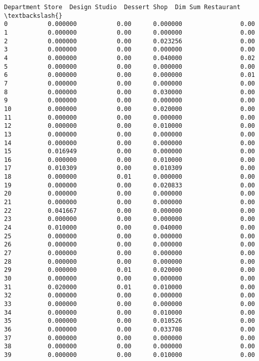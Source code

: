 \documentclass[11pt]{article}
\begin{document}
\begin{tcolorbox}[breakable, size=fbox, boxrule=.5pt, pad at break*=1mm, opacityfill=0]
\begin{Verbatim}[commandchars=\\\{\}]
    Department Store  Design Studio  Dessert Shop  Dim Sum Restaurant  \textbackslash{}
0           0.000000           0.00      0.000000                0.00
1           0.000000           0.00      0.000000                0.00
2           0.000000           0.00      0.023256                0.00
3           0.000000           0.00      0.000000                0.00
4           0.000000           0.00      0.040000                0.02
5           0.000000           0.00      0.000000                0.00
6           0.000000           0.00      0.000000                0.01
7           0.000000           0.00      0.000000                0.00
8           0.000000           0.00      0.030000                0.00
9           0.000000           0.00      0.000000                0.00
10          0.000000           0.00      0.020000                0.00
11          0.000000           0.00      0.000000                0.00
12          0.000000           0.00      0.010000                0.00
13          0.000000           0.00      0.000000                0.00
14          0.000000           0.00      0.000000                0.00
15          0.016949           0.00      0.000000                0.00
16          0.000000           0.00      0.010000                0.00
17          0.010309           0.00      0.010309                0.00
18          0.000000           0.01      0.000000                0.00
19          0.000000           0.00      0.020833                0.00
20          0.000000           0.00      0.000000                0.00
21          0.000000           0.00      0.000000                0.00
22          0.041667           0.00      0.000000                0.00
23          0.000000           0.00      0.000000                0.00
24          0.010000           0.00      0.040000                0.00
25          0.000000           0.00      0.000000                0.00
26          0.000000           0.00      0.000000                0.00
27          0.000000           0.00      0.000000                0.00
28          0.000000           0.00      0.000000                0.00
29          0.000000           0.01      0.020000                0.00
30          0.000000           0.00      0.000000                0.00
31          0.020000           0.01      0.010000                0.00
32          0.000000           0.00      0.000000                0.00
33          0.000000           0.00      0.000000                0.00
34          0.000000           0.00      0.010000                0.00
35          0.000000           0.00      0.010526                0.00
36          0.000000           0.00      0.033708                0.00
37          0.000000           0.00      0.000000                0.00
38          0.000000           0.00      0.000000                0.00
39          0.000000           0.00      0.010000                0.00


\end{Verbatim}
\end{tcolorbox}
\end{document}
